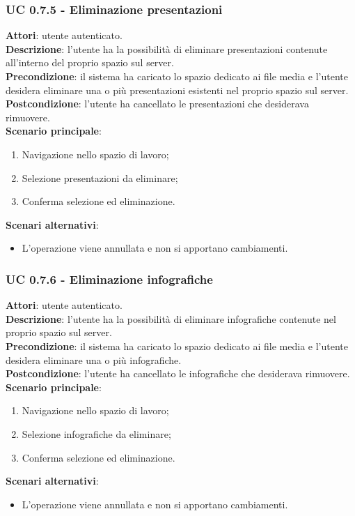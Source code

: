 	\subsubsection{UC 0.7.5 - Eliminazione presentazioni}{
		\label{uc0.7.5}
		\textbf{Attori}: utente autenticato.	\\
		\textbf{Descrizione}: l'utente ha la possibilità di eliminare presentazioni contenute all'interno del proprio spazio sul server. \\
		\textbf{Precondizione}: il sistema ha caricato lo spazio dedicato ai file media e l'utente desidera eliminare una o più presentazioni esistenti nel proprio spazio sul server.	\\
		\textbf{Postcondizione}: l'utente ha cancellato le presentazioni che desiderava rimuovere.	\\
		\textbf{Scenario principale}:
		\begin{enumerate}
			\item Navigazione nello spazio di lavoro;
			\item Selezione presentazioni da eliminare;
			\item Conferma selezione ed eliminazione.
		\end{enumerate}
		\textbf{Scenari alternativi}: 
		\begin{itemize}
			\item L'operazione viene annullata e non si apportano cambiamenti.
		\end{itemize}
		}
	\subsubsection{UC 0.7.6 - Eliminazione infografiche}{
		\label{uc0.7.6}
		\textbf{Attori}: utente autenticato.	\\
		\textbf{Descrizione}: l'utente ha la possibilità di eliminare infografiche contenute nel proprio spazio sul server. \\
		\textbf{Precondizione}: il sistema ha caricato lo spazio dedicato ai file media e l'utente desidera eliminare una o più infografiche.	\\
		\textbf{Postcondizione}: l'utente ha cancellato le infografiche che desiderava rimuovere.	\\
		\textbf{Scenario principale}:
		\begin{enumerate}
			\item Navigazione nello spazio di lavoro;
			\item Selezione infografiche da eliminare;
			\item Conferma selezione ed eliminazione.
		\end{enumerate}
		\textbf{Scenari alternativi}: 
		\begin{itemize}
			\item L'operazione viene annullata e non si apportano cambiamenti.
		\end{itemize}
		}
